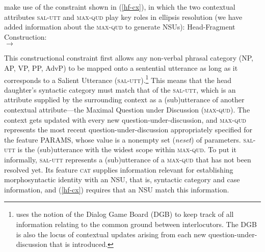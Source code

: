 {%
\citet[304]{Ginzburg:Sag:2000} make use of the constraint shown in (\ref{hf-cx}), in which 
the two contextual attributes \textsc{sal-utt} and \textsc{max-qud} play key roles in ellipsis resolution
(we have added information about the \textsc{max-qud} to generate NSUs):
%
\ea
\label{hf-cx}
Head-Fragment Construction:\\
$\rightarrow$

\z
%
%
This constructional constraint first allows 
any non-verbal phrasal category (NP, AP, VP, PP, AdvP) to be mapped onto a sentential utterance as long as it corresponds to a Salient Utterance (\textsc{sal-utt}).\footnote{\citet{Ginzburg2012} uses the notion of the Dialog Game Board (DGB) to keep track of all information relating to the common ground between interlocutors. The DGB is also the locus of contextual updates arising from each new question-under-discussion that is introduced.}
 This means that
the head daughter's syntactic category must match that of the \textsc{sal-utt}, which is an attribute supplied by the surrounding context as a (sub)utterance of another contextual attribute---the Maximal Question under Discussion (\textsc{max-qud}). The context gets updated with every new question-under-discussion, and \textsc{max-qud} represents the most recent question-under-discussion appropriately specified for the feature
PARAMS, whose value is a nonempty set (\textit{neset}) of parameters. \textsc{sal-utt} is the (sub)utterance with the widest scope within \textsc{max-qud}. To put it informally, \textsc{sal-utt} represents a (sub)utterance of a \textsc{max-qud} that has not been resolved yet. Its feature \textsc{cat} supplies information relevant for establishing morphosyntactic identity with an NSU, that is, syntactic category and case information, and (\ref{hf-cx}) requires that an NSU  match this information. 

}
